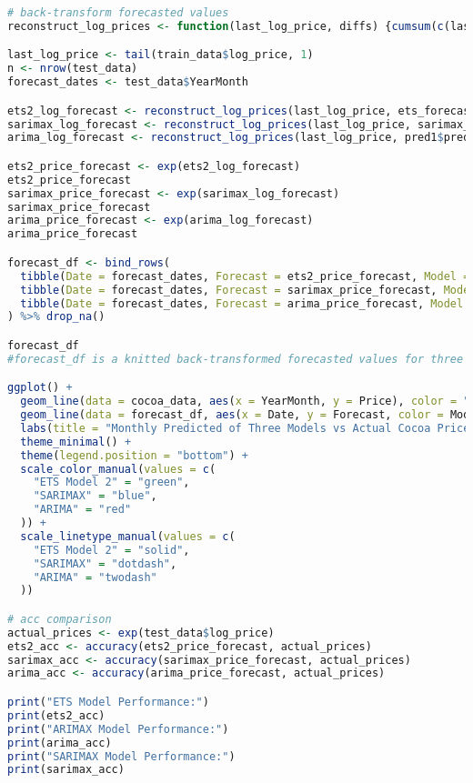 \documentclass[10pt]{article}
\begin{document}
\begin{lstlisting}[language=R, caption=SARIMA]
# back-transform forecasted values
reconstruct_log_prices <- function(last_log_price, diffs) {cumsum(c(last_log_price, diffs))[-1]}

last_log_price <- tail(train_data$log_price, 1)
n <- nrow(test_data)
forecast_dates <- test_data$YearMonth

ets2_log_forecast <- reconstruct_log_prices(last_log_price, ets_forecast_2$mean)
sarimax_log_forecast <- reconstruct_log_prices(last_log_price, sarimax_forecast$mean)
arima_log_forecast <- reconstruct_log_prices(last_log_price, pred1$pred)

ets2_price_forecast <- exp(ets2_log_forecast)
ets2_price_forecast
sarimax_price_forecast <- exp(sarimax_log_forecast)
sarimax_price_forecast
arima_price_forecast <- exp(arima_log_forecast)
arima_price_forecast

forecast_df <- bind_rows(
  tibble(Date = forecast_dates, Forecast = ets2_price_forecast, Model = "ETS Model 2"),
  tibble(Date = forecast_dates, Forecast = sarimax_price_forecast, Model = "SARIMAX"),
  tibble(Date = forecast_dates, Forecast = arima_price_forecast, Model = "ARIMA")
) %>% drop_na()

forecast_df
#forecast_df is a knitted back-transformed forecasted values for three models

ggplot() +
  geom_line(data = cocoa_data, aes(x = YearMonth, y = Price), color = "black", linewidth = 1.3) +
  geom_line(data = forecast_df, aes(x = Date, y = Forecast, color = Model, linetype = Model), linewidth = 1.3) +
  labs(title = "Monthly Predicted of Three Models vs Actual Cocoa Prices", y = "Price", x = "Date") +
  theme_minimal() +
  theme(legend.position = "bottom") +
  scale_color_manual(values = c(
    "ETS Model 2" = "green",
    "SARIMAX" = "blue",
    "ARIMA" = "red"
  )) + 
  scale_linetype_manual(values = c(
    "ETS Model 2" = "solid",
    "SARIMAX" = "dotdash",
    "ARIMA" = "twodash"
  ))

# acc comparison
actual_prices <- exp(test_data$log_price)
ets2_acc <- accuracy(ets2_price_forecast, actual_prices)
sarimax_acc <- accuracy(sarimax_price_forecast, actual_prices)
arima_acc <- accuracy(arima_price_forecast, actual_prices)

print("ETS Model Performance:")
print(ets2_acc)
print("ARIMAX Model Performance:")
print(arima_acc)
print("SARIMAX Model Performance:")
print(sarimax_acc)
\end{lstlisting}
\end{document}
